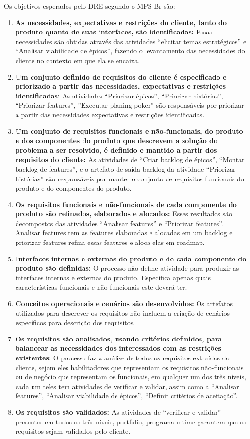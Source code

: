 Os objetivos esperados pelo DRE segundo o MPS-Br são:
\begin{enumerate}
    \item \textbf{As necessidades, expectativas e restrições do cliente, tanto do produto quanto de suas interfaces, são identificadas:} Essas necessidades são obtidas através das atividades “elicitar temas estratégicos” e “Analisar viabilidade de épicos”, fazendo o levantamento das necessidades do cliente no contexto em que ela se encaixa.
    \item \textbf{Um conjunto definido de requisitos do cliente é especificado e priorizado a partir das necessidades, expectativas e restrições identificadas:} As atividades “Priorizar épicos”, “Priorizar histórias”, “Priorizar features”, ”Executar planing poker” são responsáveis por priorizar a partir das necessidades expectativas e restrições identificadas.
    \item \textbf{Um conjunto de requisitos funcionais e não-funcionais, do produto e dos componentes do produto que descrevem a solução do problema a ser resolvido, é definido e mantido a partir dos requisitos do cliente:} As atividades de “Criar backlog de épicos”, “Montar backlog de features”, e o artefato de saída backlog da atividade “Priorizar histórias” são responsáveis por manter o conjunto de requisitos funcionais do produto e do componentes do produto.
    \item \textbf{Os requisitos funcionais e não-funcionais de cada componente do produto são refinados, elaborados e alocados:} Esses resultados são decompostos das atividades “Analisar features” e “Priorizar features”. Analisar features tem as features elaboradas e alocadas em um backlog e priorizar features refina essas features e aloca elas em roadmap.
    \item \textbf{Interfaces internas e externas do produto e de cada componente do produto são definidas:} O processo não define atividade para produzir as interfaces internas e externas do produto. Especifica apenas quais características funcionais e não funcionais este deverá ter.
    \item \textbf{Conceitos operacionais e cenários são desenvolvidos:} Os artefatos utilizados para descrever os requisitos não incluem a criação de cenários específicos para descrição dos requisitos.
    \item \textbf{Os requisitos são analisados, usando critérios definidos, para balancear as necessidades dos interessados com as restrições existentes:} O processo faz a análise de todos os requisitos extraídos do cliente, sejam eles habilitadores que representam os requisitos não-funcionais ou de negócio que representam os funcionais, em qualquer um dos três níveis, cada um teles tem atividades de verificar e validar, assim como a “Analisar features”, “Analisar viabilidade de épicos”, “Definir critérios de aceitação”.
    \item \textbf{Os requisitos são validados:} As atividades de “verificar e validar” presentes em todos os três níveis, portfólio, programa e time garantem que os requisitos sejam validados pelo cliente.
\end{enumerate}

